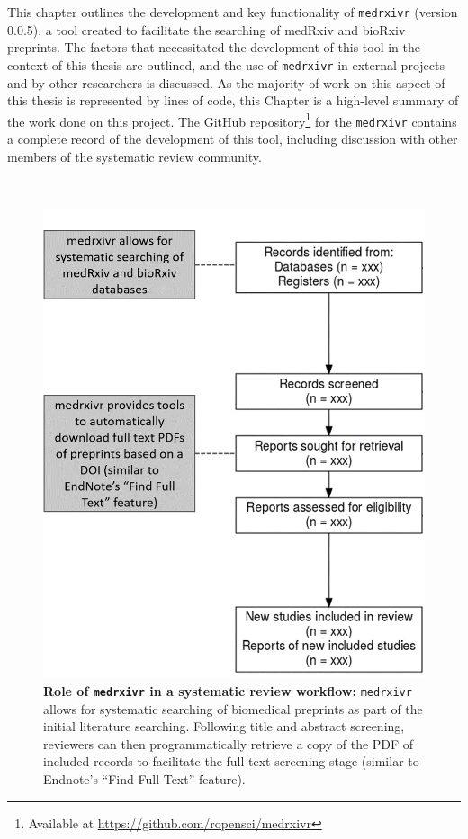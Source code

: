 \documentclass[a4paper, twoside]{templates/ociamthesis}
\begin{document}
This chapter outlines the development and key functionality of \texttt{medrxivr} (version 0.0.5), a tool created to facilitate the searching of medRxiv and bioRxiv preprints. The factors that necessitated the development of this tool in the context of this thesis are outlined, and the use of \texttt{medrxivr} in external projects and by other researchers is discussed. As the majority of work on this aspect of this thesis is represented by lines of code, this Chapter is a high-level summary of the work done on this project. The GitHub repository\footnote{Available at \url{https://github.com/ropensci/medrxivr}} for the \texttt{medrxivr} contains a complete record of the development of this tool, including discussion with other members of the systematic review community.

~





\begin{figure}
\includegraphics[width=1\linewidth]{figures/sys-rev-tools/medrxiv-role} \caption[Role of \texttt{medrxivr} in a systematic review workflow]{\textbf{Role of \texttt{medrxivr} in a systematic review workflow:} \texttt{medrxivr} allows for systematic searching of biomedical preprints as part of the initial literature searching. Following title and abstract screening, reviewers can then programmatically retrieve a copy of the PDF of included records to facilitate the full-text screening stage (similar to Endnote's ``Find Full Text'' feature).}\label{fig:medrxivr-sr}
\end{figure}
\end{document}
